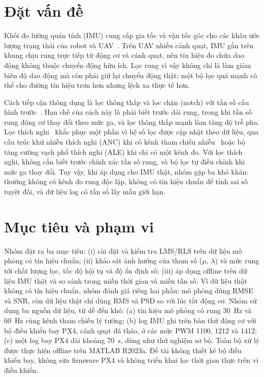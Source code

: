 \documentclass[../main.tex]{subfiles}
\begin{document}
\section{Đặt vấn đề}
\label{sec:dvd}

Khối đo lường quán tính (IMU) cung cấp gia tốc và vận tốc góc cho các khâu ước lượng trạng thái của robot và UAV~\cite{titterton2004strapdown}. Trên UAV nhiều cánh quạt, IMU gắn trên khung chịu rung trực tiếp từ động cơ và cánh quạt, nên tín hiệu đo chứa dao động không thuộc chuyển động hữu ích. Lọc rung vì vậy không chỉ là làm giảm biên độ dao động mà còn phải giữ lại chuyển động thật; một bộ lọc quá mạnh có thể cho đường tín hiệu trơn hơn nhưng lệch xa thực tế hơn.

Cách tiếp cận thông dụng là lọc thông thấp và lọc chặn (notch) với tần số cấu hình trước~\cite{oppenheim2010dtsp}. Hạn chế của cách này là phải biết trước dải rung, trong khi tần số rung động cơ thay đổi theo mức ga, và lọc thông thấp mạnh làm tăng độ trễ pha. Lọc thích nghi~\cite{haykin2014adaptive,widrow1985adaptive} khắc phục một phần vì hệ số lọc được cập nhật theo dữ liệu, qua cấu trúc khử nhiễu thích nghi (ANC) khi có kênh tham chiếu nhiễu~\cite{widrow1975anc} hoặc bộ tăng cường vạch phổ thích nghi (ALE) khi chỉ có một kênh đo. Với lọc thích nghi, không cần biết trước chính xác tần số rung, và bộ lọc tự điều chỉnh khi mức ga thay đổi. Tuy vậy, khi áp dụng cho IMU thật, nhóm gặp ba khó khăn: thường không có kênh đo rung độc lập, không có tín hiệu chuẩn để tính sai số tuyệt đối, và dữ liệu log có tần số lấy mẫu giới hạn.

\section{Mục tiêu và phạm vi}

Nhóm đặt ra ba mục tiêu: (i) cài đặt và kiểm tra LMS/RLS trên dữ liệu mô phỏng có tín hiệu chuẩn; (ii) khảo sát ảnh hưởng của tham số ($\mu$, $\lambda$) và mức rung tới chất lượng lọc, tốc độ hội tụ và độ ổn định số; (iii) áp dụng offline trên dữ liệu IMU thật và so sánh trong miền thời gian và miền tần số. Vì dữ liệu thật không có tín hiệu chuẩn, nhóm đánh giá riêng hai phần: mô phỏng dùng RMSE và SNR, còn dữ liệu thật chỉ dùng RMS và PSD so với lúc tắt động cơ. Nhóm sử dụng ba nguồn dữ liệu, từ dễ đến khó: (a) tín hiệu mô phỏng có rung 30~Hz và 60~Hz cùng kênh tham chiếu lý tưởng; (b) log IMU ghi trên bàn thử động cơ với bộ điều khiển bay PX4, cánh quạt đã tháo, ở các mức PWM 1100, 1212 và 1412; (c) một log bay PX4 dài khoảng 70~s, dùng như thử nghiệm sơ bộ. Toàn bộ xử lý được thực hiện offline trên MATLAB R2023a. Đề tài không thiết kế bộ điều khiển bay, không sửa firmware PX4 và không triển khai lọc thời gian thực trên vi điều khiển.
\end{document}
